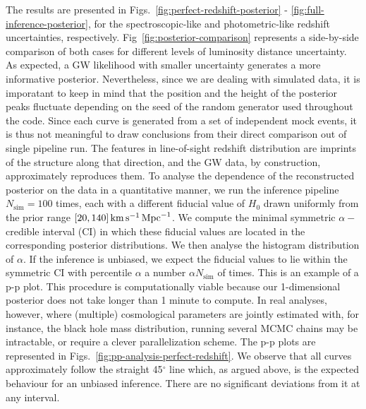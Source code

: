 \documentclass[%
preprint,
nofootinbib,
 amsmath,amssymb,
 aps,
]{revtex4-2}
\begin{document}
The results are presented in Figs.~\ref{fig:perfect-redshift-posterior} -
\ref{fig:full-inference-posterior}, for the spectroscopic-like and photometric-like redshift
uncertainties, respectively. Fig~\ref{fig:posterior-comparison} represents a side-by-side
comparison of both cases for different levels of luminosity distance uncertainty. As expected, a GW
likelihood with smaller uncertainty generates a more informative posterior. Nevertheless, since we
are dealing with simulated data, it is imporatant to keep in mind that the position and the height
of the posterior peaks fluctuate depending on the seed of the random generator used throughout the
code. Since each curve is generated from a set of independent mock events, it is thus not
meaningful to draw conclusions from their direct comparison out of single pipeline run. The
features in line-of-sight redshift distribution are imprints of the structure along that direction,
and the GW data, by construction, approximately reproduces them. To analyse the dependence of the
reconstructed posterior on the data in a quantitative manner, we run the inference pipeline
$N_\text{sim} = 100$ times, each with a different fiducial value of $H_0$ drawn uniformly from the
prior range $[20, 140] \, \rm{km} \, \rm{s}^{-1} \, \rm{Mpc}^{-1}$. We compute the minimal
symmetric $\alpha-$credible interval (CI) in which these fiducial values are located in the
corresponding posterior distributions. We then analyse the histogram distribution of $\alpha$. If
the inference is unbiased, we expect the fiducial values to lie within the symmetric CI with
percentile $\alpha$ a number $\alpha N_\text{sim}$ of times. This is an example of a p-p plot. This
procedure is computationally viable because our 1-dimensional posterior does not take longer than 1
minute to compute. In real analyses, however, where (multiple) cosmological parameters are jointly
estimated with, for instance, the black hole mass distribution, running several MCMC chains may be
intractable, or require a clever parallelization scheme. The p-p plots are represented in
Figs.~\ref{fig:pp-analysis-perfect-redshift}. We observe that all curves approximately follow the
straight 45$^{\circ}$ line which, as argued above, is the expected behaviour for an unbiased
inference. There are no significant deviations from it at any interval.
\end{document}
